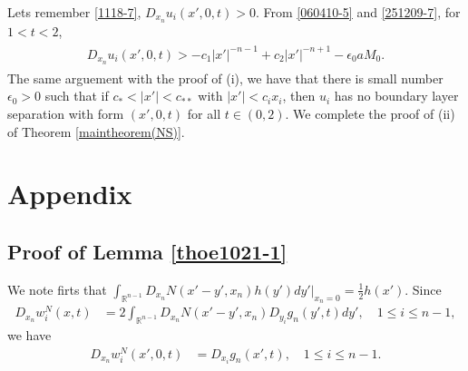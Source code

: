 \documentclass{amsart}
\numberwithin{equation}{section}
\newcommand{\ep}{{ \epsilon  }}
\newenvironment{pfthm-NS}{{\par\noindent
            \textbf{Proof of Theorem \ref{maintheorem(NS)}}\quad}}{\hfill $\square$}
\newcommand{\Rn}{{\mathbb R}^{n-1}}
\begin{document}
\begin{pfthm-NS}
  
 
 

 
 






 Lets remember  \eqref{1118-7}, $D_{x_n} u_i (x', 0, t) >0$.  From  \eqref{060410-5}  and \eqref{251209-7},   for $ 1 < t<2$, 
\begin{align*}   
\begin{split}
 D_{x_n} u_i  (x', 0,t) >      - c_1   |x'|^{-n-1}   +  c_2   |x'|^{-n+1} -    \ep_0  a M_0.
\end{split}
\end{align*}
The same arguement with the proof of (i), we have that  there is small number $\ep_0>0$ such that if $ c_* < |x'| < c_{**}$ with $ |x'| < c_i x_i$, then
$ u_i$ has no boundary layer separation with form $(x', 0, t)$ for all $ t \in  (0,2)$. We complete the proof of (ii) of Theorem \ref{maintheorem(NS)}.
\end{pfthm-NS}  



\section{Appendix}\label{app-lemmas}

\setcounter{equation}{0}

\subsection{Proof of Lemma \ref{thoe1021-1}}\label{prooflemma1}

We note firts that $\displaystyle \int_{\Rn} D_{x_n} N(x' -y', x_n) h(y') dy' \Big|_{x_n =0} =  \frac12 h(x')$. Since 
\begin{align*}
D_{x_n} w^N_i(x,t) &= 2 \int_{\Rn} D_{x_n} N(x' -y', x_n) D_{y_i} g_n(y',t) dy', \quad 1 \leq i \leq n-1, 
\end{align*}
we have 
\begin{align}\label{w-in}
 D_{x_n} w^N_i(x', 0,t) &=  D_{x_i} g_n(x',t), \quad 1 \leq i \leq n-1.
\end{align}
\end{document}
